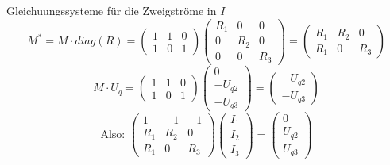 \documentclass[german]{article}
\begin{document}
	Gleichuungssysteme für die Zweigströme in $I$
	\[
		M^* = M \cdot diag(R) =
			\begin{pmatrix}
				1 & 1 & 0 \\
				1 & 0 & 1
			\end{pmatrix}
			\begin{pmatrix}
				R_1 & 0 & 0 \\
				0 & R_2 & 0 \\
				0 & 0 & R_3
			\end{pmatrix}
			=
			\begin{pmatrix}
				R_1 & R_2 & 0 \\
				R_1 & 0 & R_3
			\end{pmatrix}
	\]
	\[
		M \cdot U_q =
			\begin{pmatrix}
				1 & 1 & 0 \\
				1 & 0 & 1
			\end{pmatrix}
			\begin{pmatrix}
				0 \\
				-U_{q2} \\
				-U_{q3}
			\end{pmatrix}
			=
			\begin{pmatrix}
				- U_{q2} \\
				- U_{q3}
			\end{pmatrix}
	\]
	\[
		\text{Also: }
		\begin{pmatrix}
			1 & -1 & -1 \\
			R_1 & R_2 & 0 \\
			R_1 & 0 & R_3
		\end{pmatrix}
		\begin{pmatrix}
			I_1 \\
			I_2 \\
			I_3
		\end{pmatrix}
		=
		\begin{pmatrix}
			0 \\
			U_{q2} \\
			U_{q3}
		\end{pmatrix}
	\]
\end{document}
